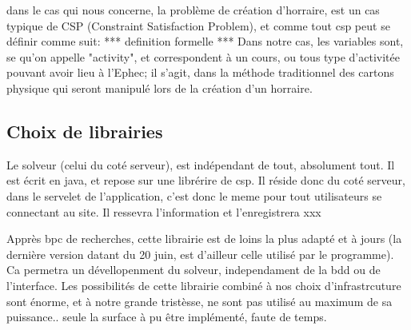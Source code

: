 dans le cas qui nous concerne, la problème de création d'horraire, est un cas typique de CSP (Constraint Satisfaction Problem), et comme tout csp peut se définir comme suit:
*** definition formelle ***
Dans notre cas, les variables sont, se qu'on appelle "activity", et correspondent à un cours, ou tous type d'activitée pouvant avoir lieu à l'Ephec; il s'agit, dans la méthode traditionnel des cartons physique qui seront manipulé lors de la création d'un horraire.




\subsection{Choix de librairies}
Le solveur (celui du coté serveur), est indépendant de tout, absolument tout. Il est écrit en java, et repose sur une librérire de csp. Il réside donc du coté serveur, dans le servelet de l'application, c'est donc le meme pour tout utilisateurs se connectant au  site. Il ressevra l'information et l'enregistrera xxx


Apprès bpc de recherches, cette librairie est de loins la plus adapté et à jours (la dernière version datant du 20 juin, est d'ailleur celle utilisé par le programme).  Ca permetra un dévellopenment du solveur, independament de la bdd ou de l'interface.
Les possibilités de cette librairie combiné à nos choix d'infrastrcuture sont énorme, et à notre grande tristèsse, ne sont pas utilisé au maximum de sa puissance..  seule la surface à pu être implémenté, faute de temps.
